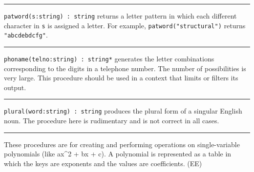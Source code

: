 




\vspace{0.25cm}\hrule{}

\texttt{patword(s:string) : string} returns a letter pattern in which
each different character in \texttt{s} is assigned a letter. For
example, \texttt{patword("structural")}
returns \texttt{"abcdebdcfg"}.

\vspace{0.25cm}\hrule{}

\texttt{phoname(telno:string) : string*} generates the letter
combinations corresponding to the digits in a telephone number. The
number of possibilities is very large. This procedure should be used in
a context that limits or filters its output.

\vspace{0.25cm}\hrule{}

\texttt{plural(word:string) : string} produces the plural form of a singular English noun. The procedure here is
rudimentary and is not correct in all cases. 

\vspace{0.25cm}\hrule{}

These procedures are for creating and performing operations on
single-variable polynomials (like ax\^{}2 + bx + c).
A polynomial is represented as a table in which the keys are exponents
and the values are coefficients. (EE)

